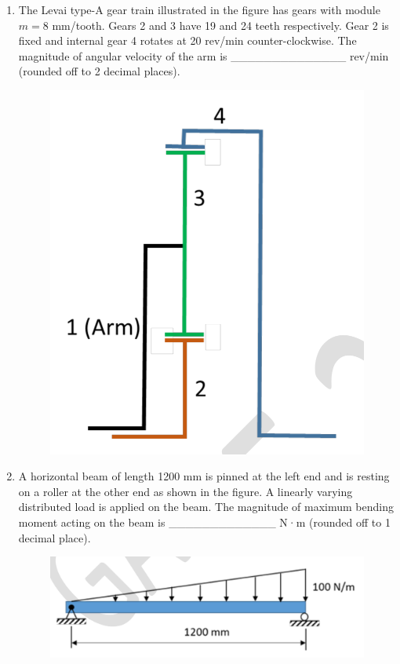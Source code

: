 \documentclass[journal,11pt,onecolumn]{IEEEtran}
\begin{document}
\begin{enumerate}[resume]
    \item The Levai type-A gear train illustrated in the figure has gears with module $m = 8$ mm/tooth. Gears 2 and 3 have 19 and 24 teeth respectively. Gear 2 is fixed and internal gear 4 rotates at 20 rev/min counter-clockwise. The magnitude of angular velocity of the arm is \_\_\_\_\_\_\_\_\_\_\_\_\_\_ rev/min (rounded off to 2 decimal places).

          \begin{figure}[H]
              \centering
              \includegraphics[scale=0.2]{q52}
              \caption{}
              \label{fig:q52}
          \end{figure}

    \item A horizontal beam of length 1200 mm is pinned at the left end and is resting on a roller at the other end as shown in the figure. A linearly varying distributed load is applied on the beam. The magnitude of maximum bending moment acting on the beam is \_\_\_\_\_\_\_\_\_\_\_\_\_ N·m (rounded off to 1 decimal place).

          \begin{figure}[H]
              \centering
              \includegraphics[scale=0.2]{q53}
              \caption{}
              \label{fig:q53}
          \end{figure}


\end{enumerate}
\end{document}
